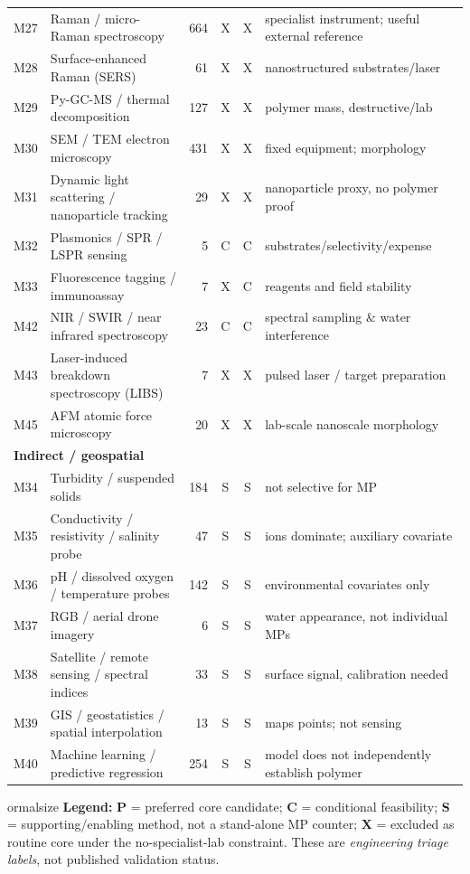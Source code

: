 \begin{longtable}{@{}p{.8cm}p{6.0cm}rccp{5.4cm}@{}}
M27 & Raman / micro-Raman spectroscopy & 664 & X & X & specialist instrument; useful external reference \\
M28 & Surface-enhanced Raman (SERS) & 61 & X & X & nanostructured substrates/laser \\
M29 & Py-GC-MS / thermal decomposition & 127 & X & X & polymer mass, destructive/lab \\
M30 & SEM / TEM electron microscopy & 431 & X & X & fixed equipment; morphology \\
M31 & Dynamic light scattering / nanoparticle tracking & 29 & X & X & nanoparticle proxy, no polymer proof \\
M32 & Plasmonics / SPR / LSPR sensing & 5 & C & C & substrates/selectivity/expense \\
M33 & Fluorescence tagging / immunoassay & 7 & X & C & reagents and field stability \\
M42 & NIR / SWIR / near infrared spectroscopy & 23 & C & C & spectral sampling \& water interference \\
M43 & Laser-induced breakdown spectroscopy (LIBS) & 7 & X & X & pulsed laser / target preparation \\
M45 & AFM atomic force microscopy & 20 & X & X & lab-scale nanoscale morphology \\
\multicolumn{6}{l}{\textbf{Indirect / geospatial}}\\[2pt]
M34 & Turbidity / suspended solids & 184 & S & S & not selective for MP \\
M35 & Conductivity / resistivity / salinity probe & 47 & S & S & ions dominate; auxiliary covariate \\
M36 & pH / dissolved oxygen / temperature probes & 142 & S & S & environmental covariates only \\
M37 & RGB / aerial drone imagery & 6 & S & S & water appearance, not individual MPs \\
M38 & Satellite / remote sensing / spectral indices & 33 & S & S & surface signal, calibration needed \\
M39 & GIS / geostatistics / spatial interpolation & 13 & S & S & maps points; not sensing \\
M40 & Machine learning / predictive regression & 254 & S & S & model does not independently establish polymer \\
\end{longtable}
ormalsize
\noindent\textbf{Legend:} \textbf{P} = preferred core candidate; \textbf{C} = conditional feasibility; \textbf{S} = supporting/enabling method, not a stand-alone MP counter; \textbf{X} = excluded as routine core under the no-specialist-lab constraint. These are \emph{engineering triage labels}, not published validation status.\par
